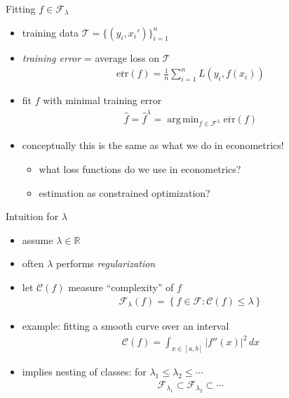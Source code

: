 \documentclass[xcolor=dvipsnames]{beamer}
\DeclareMathOperator{\argmin}{arg\,min}
\begin{document}
\begin{frame}{Fitting $f \in \mathcal{F}_{\lambda}$}
\begin{itemize}
  \item training data $\mathcal{T} = \{ (y_i, x_i') \}_{i=1}^n$
  \item \emph{training error} = average loss on $\mathcal{T}$
  \begin{align*}
     \overline{\text{err}} (f) = \frac{1}{n} \sum_{i=1}^n L\left(y_i, f(x_i) \right) 
   \end{align*} 
   \item fit $f$ with minimal training error
   \begin{align*}
     \hat{f} = \hat{f}^{\lambda} = \argmin_{f \in \mathcal{F}^{\lambda}} \overline{\text{err}} (f) 
   \end{align*}
   \item conceptually this is the same as what we do in econometrics! 
   \begin{itemize}
     \item what loss functions do we use in econometrics?
     \item estimation as constrained optimization?
   \end{itemize}
\end{itemize}
\end{frame}


\begin{frame}{Intuition for $\lambda$}
\begin{itemize}
  \item assume $\lambda \in \mathbb{R}$
  \item often $\lambda$ performs \emph{regularization}
  \item let $\mathcal{C}(f)$ measure ``complexity'' of $f$
  \begin{align*}
    \mathcal{F}_{\lambda}(f) = \left\{f \in \mathcal{F} : \mathcal{C}(f) \leq \lambda \right\}   
  \end{align*} 
  \item example: fitting a smooth curve over an interval
  \begin{align*}
    \mathcal{C}(f) = \int_{x \in [a,b]} \lvert f''(x) \rvert^2 \, dx
  \end{align*}
  \item implies nesting of classes: for $\lambda_1 \leq \lambda_2 \leq \dotsb$
  \begin{align*}
    \mathcal{F}_{\lambda_1}\subset \mathcal{F}_{\lambda_2} \subset \dotsb
  \end{align*}
\end{itemize}
\end{frame}
\end{document}
